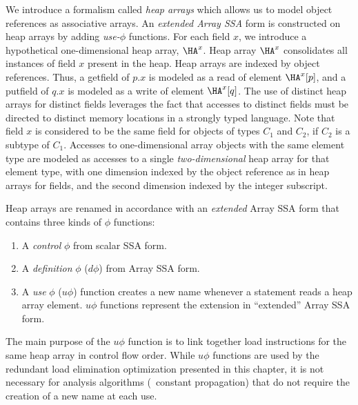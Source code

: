 We introduce a
formalism called {\em heap arrays} which allows us to model
object references as associative arrays.   
An {\em extended Array SSA} form is constructed on heap arrays by
adding
{\em use-$\phi$} functions.
For each field $x$, we introduce
a hypothetical one-dimensional
heap array,  $\HA^x$.
Heap array $\HA^x$ consolidates all instances of field
$x$ present in the heap.
Heap arrays are indexed by object references.
Thus, a {\sc getfield}
of $p.x$ is modeled as a read of element $\HA^x[p]$,
and a {\sc putfield} of $q.x$ is modeled as a write of element $\HA^x[q]$.
The use of distinct heap arrays for distinct fields leverages the 
fact that accesses to distinct fields must be directed to 
distinct memory locations in a strongly typed language.
Note that field $x$ is considered to be the same field for objects of types
$C_1$ and $C_2$, if $C_2$ is
a subtype of $C_1$.
Accesses to one-dimensional array objects with the same element type
are modeled as accesses to a single {\it two-dimensional} heap
array for that element type, with one dimension indexed by
the object reference as in heap arrays for fields, and the second
dimension indexed by the integer subscript. 


Heap arrays are renamed in accordance with 
an {\it extended}
Array SSA form that contains three kinds of $\phi$ functions:
\begin{enumerate}
\item 
A {\em control} $\phi$ from scalar SSA form.
\item
A {\em definition} $\phi$ ($d\phi$) from Array SSA form.
\item
A {\em use} $\phi$ ($u\phi$) function creates
a new name whenever a statement reads a heap array element.
$u\phi$ functions represent the extension
in ``extended'' Array SSA form.
\end{enumerate}
The main purpose of the $u\phi$ function is to link
together load instructions for the same heap array in control
flow order.   While $u\phi$ functions are used by the redundant load
elimination optimization presented in this chapter, it is not
necessary for analysis algorithms (\eg\ constant propagation) that do not require the creation of
a 
new name at each use.
